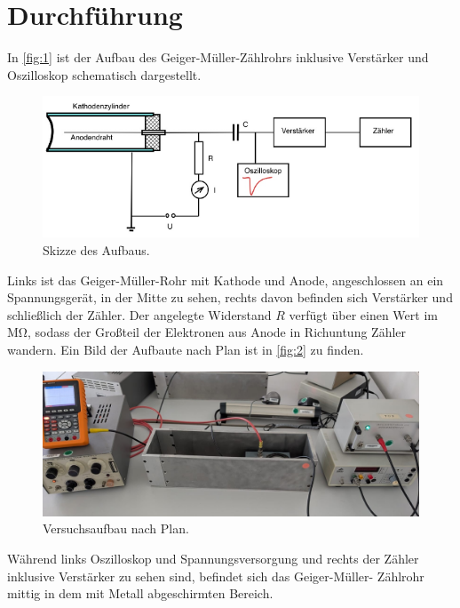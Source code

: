 \section{Durchführung}
\label{sec:Durchführung}

In \autoref{fig:1} ist der Aufbau des Geiger-Müller-Zählrohrs inklusive 
Verstärker und Oszilloskop schematisch dargestellt.
\begin{figure}[H]
    \centering
        \centering
        \includegraphics[width=\textwidth]{Bilder/aufbau.png}
        \caption{Skizze des Aufbaus. \cite{anleitung6}}
    \hfill
    \label{fig:1}
\end{figure}
\noindent Links ist das Geiger-Müller-Rohr mit Kathode und Anode, angeschlossen 
an ein Spannungsgerät, in der Mitte zu sehen, rechts davon befinden sich
Verstärker und schließlich der Zähler. Der angelegte Widerstand $R$ verfügt
über einen Wert im $\unit{\mega\ohm}$, sodass der Großteil der Elektronen aus
Anode in Richuntung Zähler wandern.
Ein Bild der Aufbaute nach Plan ist in \autoref{fig:2} zu finden.
\begin{figure}[H]
    \centering
        \centering
        \includegraphics[width=\textwidth]{Bilder/aufbau1.jpg}
        \caption{Versuchsaufbau nach Plan.}
    \hfill
    \label{fig:2}
\end{figure}
\noindent Während links Oszilloskop und Spannungsversorgung und rechts der 
Zähler inklusive Verstärker zu sehen sind, befindet sich das Geiger-Müller-
Zählrohr mittig in dem mit Metall abgeschirmten Bereich.

